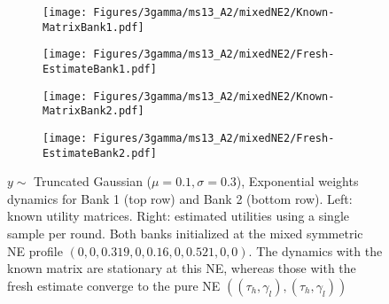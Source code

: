 \begin{figure}[H]
    \centering
    \begin{subfigure}{0.49\linewidth}
        \centering
        \texttt{[image: Figures/3gamma/ms13\_A2/mixedNE2/Known-MatrixBank1.pdf]}
    \end{subfigure}
    \begin{subfigure}{0.49\linewidth}
        \centering
        \texttt{[image: Figures/3gamma/ms13\_A2/mixedNE2/Fresh-EstimateBank1.pdf]}
    \end{subfigure}

    \begin{subfigure}{0.49\linewidth}
        \centering
        \texttt{[image: Figures/3gamma/ms13\_A2/mixedNE2/Known-MatrixBank2.pdf]}
    \end{subfigure}
    \begin{subfigure}{0.49\linewidth}
        \centering
        \texttt{[image: Figures/3gamma/ms13\_A2/mixedNE2/Fresh-EstimateBank2.pdf]}
    \end{subfigure}
    \caption{$y \sim$ Truncated Gaussian ($\mu=0.1, \sigma=0.3$), Exponential weights dynamics for Bank 1 (top row) and Bank 2 (bottom row). Left: known utility matrices. Right: estimated utilities using a single sample per round. Both banks initialized at the mixed symmetric NE profile $(0, 0, 0.319, 0, 0.16, 0, 0.521, 0, 0)$. The dynamics with the known matrix are stationary at this NE, whereas those with the fresh estimate converge to the pure NE $((\tau_h, \gamma_l),(\tau_h, \gamma_l))$ \label{fig:dyna-A2-mixed2}}

\end{figure}

